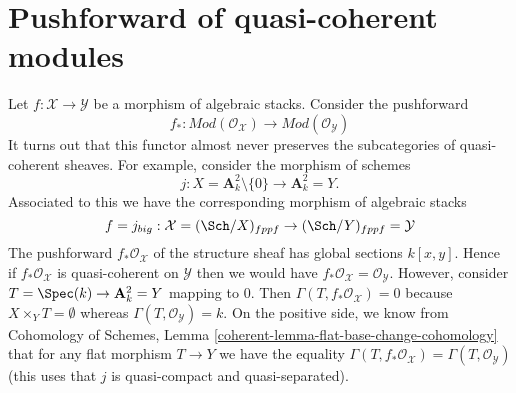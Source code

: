 \section{Pushforward of quasi-coherent modules}
\label{section-pushforward-quasi-coherent}

\noindent
Let $f : \mathcal{X} \to \mathcal{Y}$ be a morphism of algebraic stacks.
Consider the pushforward
$$
f_* :
\textit{Mod}(\mathcal{O}_\mathcal{X})
\longrightarrow
\textit{Mod}(\mathcal{O}_\mathcal{Y})
$$
It turns out that this functor almost never preserves the subcategories
of quasi-coherent sheaves. For example, consider the morphism of schemes
$$
j : X = \mathbf{A}^2_k \setminus \{0\} \longrightarrow \mathbf{A}^2_k = Y.
$$
Associated to this we have the corresponding morphism of algebraic stacks
$$
f = j_{big} : \mathcal{X} = (\Sch/X)_{fppf} \to
(\Sch/Y)_{fppf} = \mathcal{Y}
$$
The pushforward $f_*\mathcal{O}_\mathcal{X}$ of the structure sheaf has
global sections $k[x, y]$. Hence if $f_*\mathcal{O}_\mathcal{X}$ is
quasi-coherent on $\mathcal{Y}$ then we would have
$f_*\mathcal{O}_\mathcal{X} = \mathcal{O}_\mathcal{Y}$. However,
consider $T = \Spec(k) \to \mathbf{A}^2_k = Y$ mapping to $0$.
Then $\Gamma(T, f_*\mathcal{O}_\mathcal{X}) = 0$ because
$X \times_Y T = \emptyset$ whereas $\Gamma(T, \mathcal{O}_\mathcal{Y}) = k$.
On the positive side, we know from
Cohomology of Schemes, Lemma \ref{coherent-lemma-flat-base-change-cohomology}
that for any flat morphism $T \to Y$ we have the equality
$\Gamma(T, f_*\mathcal{O}_\mathcal{X}) = \Gamma(T, \mathcal{O}_\mathcal{Y})$
(this uses that $j$ is quasi-compact and quasi-separated).

